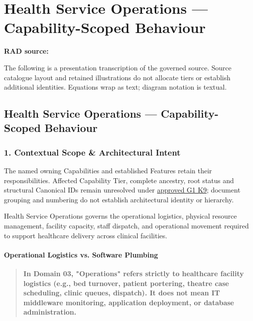 \chapter{Health Service Operations — Capability-Scoped Behaviour}\label{rad:hso}
\noindent\textbf{RAD source:} \texttt{}

The following is a presentation transcription of the governed source. Source catalogue layout and retained illustrations do not allocate tiers or establish additional identities. Equations wrap as text; diagram notation is textual.

\label{rad:hso:1}
\section*{Health Service Operations — Capability-Scoped Behaviour}
\label{rad:hso:3}
\subsection*{1. Contextual Scope \& Architectural Intent}
\label{rad:hso:5}

The named owning Capabilities and established Features retain their responsibilities. Affected Capability Tier, complete ancestry, root status and structural Canonical IDs remain unresolved under \hyperref[rad:k9:1392]{approved G1 K9}; document grouping and numbering do not establish architectural identity or hierarchy.

\label{rad:hso:7}

Health Service Operations governs the operational logistics, physical resource management, facility capacity, staff dispatch, and operational movement required to support healthcare delivery across clinical facilities.

\label{rad:hso:9}
\subsubsection*{Operational Logistics vs. Software Plumbing}
\label{rad:hso:10}

\begin{quote}

\textbf{In Domain 03, "Operations" refers strictly to healthcare facility logistics (e.g., bed turnover, patient portering, theatre case scheduling, clinic queues, dispatch). It does not mean IT middleware monitoring, application deployment, or database administration.}


\end{quote}
\label{rad:hso:12}

